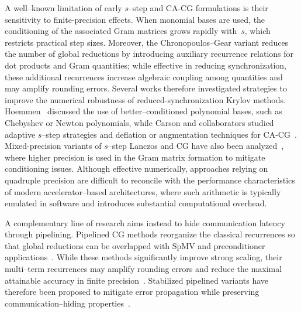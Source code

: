 \documentclass[pdflatex,sn-mathphys-num]{sn-jnl}%
\begin{document}
A well--known limitation of early $s$--step and CA-CG formulations is their sensitivity to finite-precision effects. When monomial bases are used, the conditioning of the associated Gram matrices grows rapidly with~$s$, which restricts practical step sizes. Moreover, the Chronopoulos--Gear variant reduces the number of global reductions by introducing auxiliary recurrence relations for dot products and Gram quantities; while effective in reducing synchronization, these additional recurrences increase algebraic coupling among quantities and may amplify rounding errors. Several works therefore investigated strategies to improve the numerical robustness of reduced-synchronization Krylov methods. Hoemmen~\cite{Hoemmen2010} discussed the use of better--conditioned polynomial bases, such as Chebyshev or Newton polynomials, while Carson and collaborators studied adaptive $s$--step strategies and deflation or augmentation techniques for CA-CG~\cite{CarsonAdaptive2018,CarsonKnightDemmel2014}. Mixed-precision variants of $s$--step Lanczos and CG have also been analyzed~\cite{CarsonGergelitsYamazaki2022}, where higher precision is used in the Gram matrix formation to mitigate conditioning issues. Although effective numerically, approaches relying on quadruple precision are difficult to reconcile with the performance characteristics of modern accelerator--based architectures, where such arithmetic is typically emulated in software and introduces substantial computational overhead.

A complementary line of research aims instead to hide communication latency through pipelining. Pipelined CG methods reorganize the classical recurrences so that global reductions can be overlapped with SpMV and preconditioner applications~\cite{GhyselsVanroose2014}. While these methods significantly improve strong scaling, their multi--term recurrences may amplify rounding errors and reduce the maximal attainable accuracy in finite precision~\cite{CarsonPipelined2018}. Stabilized pipelined variants have therefore been proposed to mitigate error propagation while preserving communication--hiding properties~\cite{Cools2017Stabilized,Cornelis2019StableRecurrences}.
\end{document}
